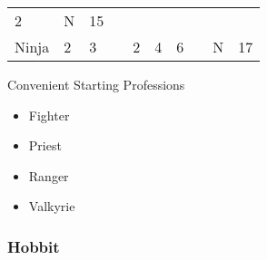 \documentclass[12pt]{article}
\begin{document}
\begin{longtable}[]{@{}llllllllll@{}}
\begin{minipage}[t]{0.06\columnwidth}
2
\strut\end{minipage} &
\begin{minipage}[t]{0.07\columnwidth}\raggedright\strut
N
\strut\end{minipage} &
\begin{minipage}[t]{0.08\columnwidth}\raggedright\strut
15
\strut\end{minipage}\tabularnewline
\begin{minipage}[t]{0.13\columnwidth}\raggedright\strut
Ninja
\strut\end{minipage} &
\begin{minipage}[t]{0.06\columnwidth}\raggedright\strut
2
\strut\end{minipage} &
\begin{minipage}[t]{0.06\columnwidth}\raggedright\strut
3
\strut\end{minipage} &
\begin{minipage}[t]{0.06\columnwidth}\raggedright\strut
\strut\end{minipage} &
\begin{minipage}[t]{0.06\columnwidth}\raggedright\strut
2
\strut\end{minipage} &
\begin{minipage}[t]{0.06\columnwidth}\raggedright\strut
4
\strut\end{minipage} &
\begin{minipage}[t]{0.06\columnwidth}\raggedright\strut
6
\strut\end{minipage} &
\begin{minipage}[t]{0.06\columnwidth}\raggedright\strut
\strut\end{minipage} &
\begin{minipage}[t]{0.07\columnwidth}\raggedright\strut
N
\strut\end{minipage} &
\begin{minipage}[t]{0.08\columnwidth}\raggedright\strut
17
\strut\end{minipage}\tabularnewline
\bottomrule
\end{longtable}

Convenient Starting Professions

\begin{itemize}
\item
  Fighter
\item
  Priest
\item
  Ranger
\item
  Valkyrie
\end{itemize}

\subsubsection{Hobbit}\label{hobbit}
\end{document}
